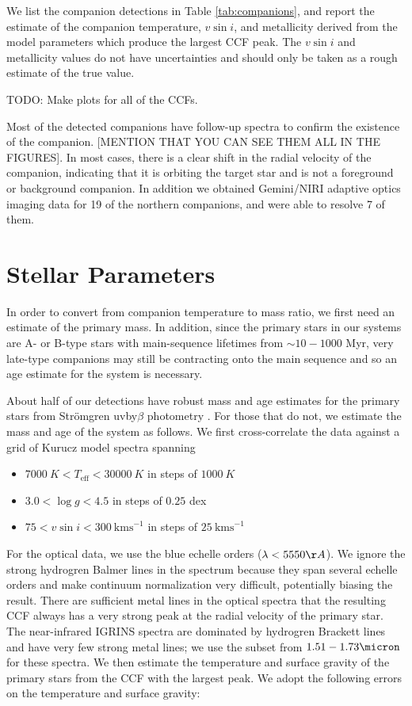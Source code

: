 \documentclass{emulateapj}
\begin{document}
We list the companion detections in Table \ref{tab:companions}, and report the estimate of the companion temperature, $v\sin{i}$, and metallicity derived from the model parameters which produce the largest CCF peak. The $v\sin{i}$ and metallicity values do not have uncertainties and should only be taken as a rough estimate of the true value. 

TODO: Make plots for all of the CCFs.

Most of the detected companions have follow-up spectra to confirm the existence of the companion. [MENTION THAT YOU CAN SEE THEM ALL IN THE FIGURES]. In most cases, there is a clear shift in the radial velocity of the companion, indicating that it is orbiting the target star and is not a foreground or background companion. In addition we obtained Gemini/NIRI adaptive optics imaging data for 19 of the northern companions, and were able to resolve 7 of them. 




\section{Stellar Parameters}
\label{sec:sp}

In order to convert from companion temperature to mass ratio, we first need an estimate of the primary mass. In addition, since the primary stars in our systems are A- or B-type stars with main-sequence lifetimes from $\sim 10 - 1000$ Myr, very late-type companions may still be contracting onto the main sequence and so an age estimate for the system is necessary. 

About half of our detections have robust mass and age estimates for the primary stars from Str\"omgren uvby$\beta$ photometry \citep{David2015}. For those that do not, we estimate the mass and age of the system as follows. We first cross-correlate the data against a grid of Kurucz model spectra \citep{Castelli2003} spanning

\begin{itemize}
\item $7000\ K < T_\mathrm{eff} < 30000\ K$ in steps of $1000\ K$
\item $3.0 < \log{g} < 4.5$ in steps of $0.25$ dex
\item $75 < v\sin{i} < 300\ \mathrm{km s}^{-1}$ in steps of $25\ \mathrm{km s}^{-1}$
\end{itemize}
For the optical data, we use the blue echelle orders ($\lambda < 5550 \AA$). We ignore the strong hydrogren Balmer lines in the spectrum because they span several echelle orders and make continuum normalization very difficult, potentially biasing the result. There are sufficient metal lines in the optical spectra that the resulting CCF always has a very strong peak at the radial velocity of the primary star. The near-infrared IGRINS spectra are dominated by hydrogren Brackett lines and have very few strong metal lines; we use the subset from $1.51 - 1.73 \micron$ for these spectra. We then estimate the temperature and surface gravity of the primary stars from the CCF with the largest peak. We adopt the following errors on the temperature and surface gravity:
\end{document}

